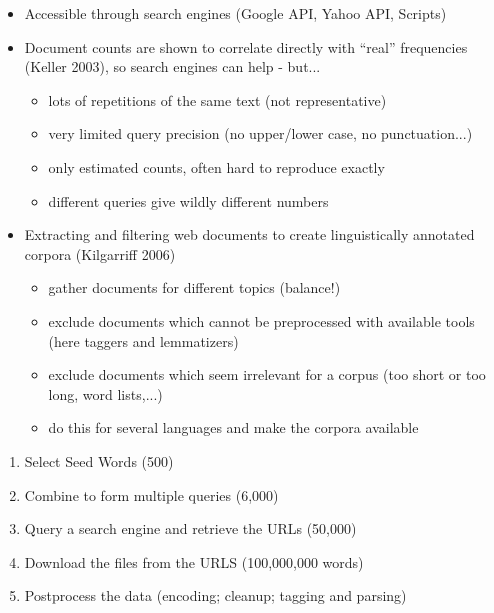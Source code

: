 \documentclass[a4paper,landscape,headrule,footrule,xetex]{foils}
\begin{document}
\begin{itemize}
\item Accessible through search engines (Google API, Yahoo API, Scripts)

\item Document counts are shown to correlate directly with ``real''
  frequencies (Keller 2003), so search engines can help - but...
  \begin{itemize}
  \item lots of repetitions of the same text (not representative)
  \item very limited query precision (no upper/lower case, no punctuation...)
  \item only estimated counts, often hard to reproduce exactly
  \item different queries give wildly different numbers
  \end{itemize}
\end{itemize}

\MyLogo{}
\begin{itemize}
\item Extracting and filtering web documents to create linguistically
  annotated corpora (Kilgarriff 2006)
  \begin{itemize}
  \item gather documents for different topics (balance!)
  \item exclude documents which cannot be preprocessed with available
    tools (here taggers and lemmatizers)
  \item exclude documents which seem irrelevant for a corpus (too short or
    too long, word lists,...)
  \item do this for several languages and make the corpora available
  \end{itemize}
\end{itemize}



\begin{enumerate}
\item Select Seed Words (500)
\item Combine to form multiple queries (6,000)
\item Query a search engine and retrieve the URLs (50,000)
\item Download the files from the URLS (100,000,000 words)
\item Postprocess the data (encoding; cleanup; tagging and parsing)
\end{enumerate}
\end{document}
